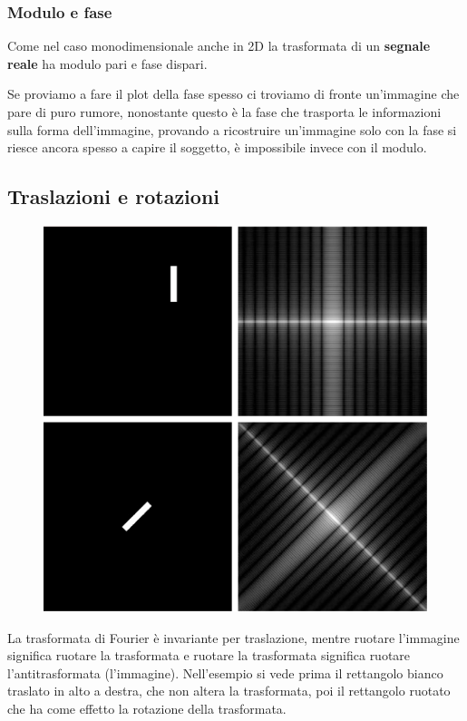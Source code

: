 \subsubsection{Modulo e fase}
Come nel caso monodimensionale anche in 2D la trasformata di un \textbf{segnale reale} ha modulo pari e fase dispari.

Se proviamo a fare il plot della fase spesso ci troviamo di fronte un'immagine che pare di puro rumore, nonostante questo è la fase che trasporta le informazioni sulla forma dell'immagine, provando a ricostruire un'immagine solo con la fase si riesce ancora spesso a capire il soggetto, è impossibile invece con il modulo.

\subsection{Traslazioni e rotazioni}
\begin{figure}
	\vspace{-.5cm}
	\centering
	\includegraphics[width=.95\linewidth]{Picture/Rotation_Traslation}
\end{figure}
La trasformata di Fourier è invariante per traslazione, mentre ruotare l'immagine significa ruotare la trasformata e ruotare la trasformata significa ruotare l'antitrasformata (l'immagine). Nell'esempio si vede prima il rettangolo bianco traslato in alto a destra, che non altera la trasformata, poi il rettangolo ruotato che ha come effetto la rotazione della trasformata.

